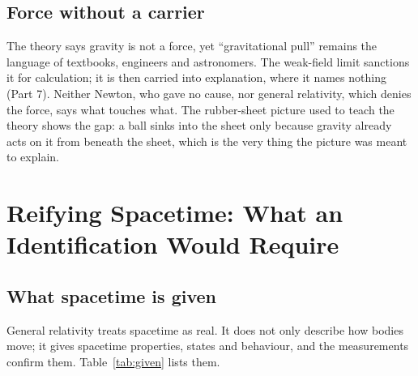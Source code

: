 \subsection{Force without a carrier}

 The theory says gravity is not a force, yet ``gravitational pull'' remains the language of textbooks, engineers and astronomers. The weak-field limit sanctions it for calculation; it is then carried into explanation, where it names nothing (Part 7). Neither Newton, who gave no cause, nor general relativity, which denies the force, says what touches what. The rubber-sheet picture used to teach the theory shows the gap: a ball sinks into the sheet only because gravity already acts on it from beneath the sheet, which is the very thing the picture was meant to explain.

\section{Reifying Spacetime: What an Identification Would Require}

\subsection{What spacetime is given}

General relativity treats spacetime as real. It does not only describe how bodies move; it gives spacetime properties, states and behaviour, and the measurements confirm them. Table~\ref{tab:given} lists them.

